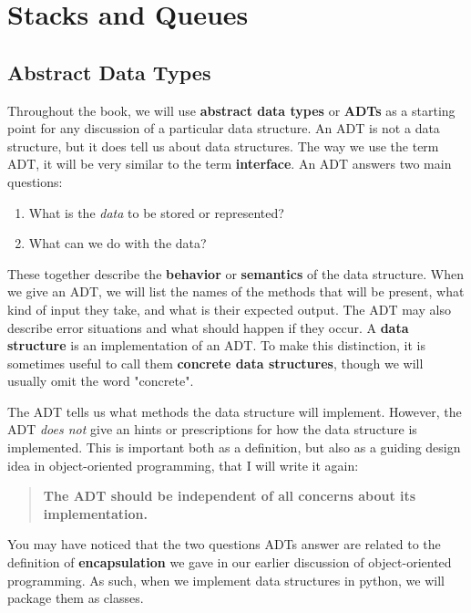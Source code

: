 \chapter{Stacks and Queues}

\section{Abstract Data Types}


Throughout the book, we will use \textbf{abstract data types} or \textbf{ADTs} as a starting point for any discussion of a particular data structure.
An ADT is not a data structure, but it does tell us about data structures.
The way we use the term ADT, it will be very similar to the term \textbf{interface}.
An ADT answers two main questions:

\begin{enumerate}

\item What is the \emph{data} to be stored or represented?

\item What can we do with the data?

\end{enumerate}

These together describe the \textbf{behavior} or \textbf{semantics} of the data structure.
When we give an ADT, we will list the names of the methods that will be present, what kind of input they take, and what is their expected output.
The ADT may also describe error situations and what should happen if they occur.
A \textbf{data structure} is an implementation of an ADT.
To make this distinction, it is sometimes useful to call them \textbf{concrete data structures}, though we will usually omit the word "concrete".


The ADT tells us what methods the data structure will implement.
However, the ADT \emph{does not} give an hints or prescriptions for how the data structure is implemented.
This is important both as a definition, but also as a guiding design idea in object-oriented programming, that I will write it again:

\begin{quote}

\textbf{The ADT should be independent of all concerns about its implementation.}

\end{quote}

You may have noticed that the two questions ADTs answer are related to the definition of \textbf{encapsulation} we gave in our earlier discussion of object-oriented programming.
As such, when we implement data structures in python, we will package them as classes.

